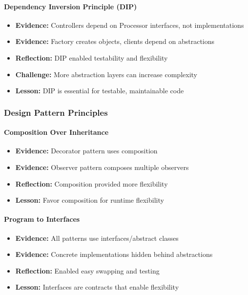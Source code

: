 \documentclass[11pt, a4paper]{article}
\theoremstyle{plain}
\theoremstyle{definition}
\begin{document}
\paragraph{Dependency Inversion Principle (DIP)}
\begin{itemize}
    \item \textbf{Evidence:} Controllers depend on Processor interfaces, not implementations
    \item \textbf{Evidence:} Factory creates objects, clients depend on abstractions
    \item \textbf{Reflection:} DIP enabled testability and flexibility
    \item \textbf{Challenge:} More abstraction layers can increase complexity
    \item \textbf{Lesson:} DIP is essential for testable, maintainable code
\end{itemize}

\subsubsection{Design Pattern Principles}

\paragraph{Composition Over Inheritance}
\begin{itemize}
    \item \textbf{Evidence:} Decorator pattern uses composition
    \item \textbf{Evidence:} Observer pattern composes multiple observers
    \item \textbf{Reflection:} Composition provided more flexibility
    \item \textbf{Lesson:} Favor composition for runtime flexibility
\end{itemize}

\paragraph{Program to Interfaces}
\begin{itemize}
    \item \textbf{Evidence:} All patterns use interfaces/abstract classes
    \item \textbf{Evidence:} Concrete implementations hidden behind abstractions
    \item \textbf{Reflection:} Enabled easy swapping and testing
    \item \textbf{Lesson:} Interfaces are contracts that enable flexibility
\end{itemize}
\end{document}
